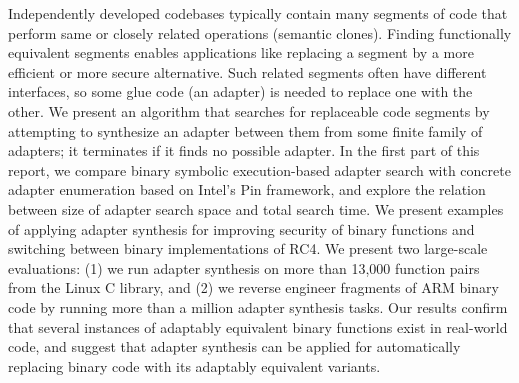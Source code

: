 Independently developed codebases typically contain many segments of
code that perform same or closely related operations (semantic
clones). Finding functionally equivalent segments enables applications
like replacing a segment by a more efficient or more secure
alternative. Such related segments often have different interfaces, so
some glue code (an adapter) is needed to replace one with the other.
We present an algorithm that searches for replaceable code segments by
attempting to synthesize an adapter between them from some finite family of
adapters; it terminates if it finds no possible adapter. In the first part of this report, we compare binary symbolic
execution-based adapter search with concrete adapter enumeration based on Intel's
Pin framework, and explore the relation
between size of adapter search space and total search time. We present
examples of applying adapter synthesis for improving security of
binary functions and switching between binary implementations of RC4.
We present two large-scale evaluations: (1) we run adapter synthesis on more
than 13,000 function pairs from the Linux C library, and (2) we
reverse engineer fragments of ARM binary code by running more than a
million adapter synthesis tasks. Our results confirm that several
instances of adaptably equivalent binary functions exist in real-world
code, and suggest that adapter synthesis can be applied for automatically replacing binary code with its
adaptably equivalent variants.

